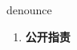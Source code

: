
\begin{frame}
{\huge denounce}
\begin{center}
\begin{enumerate}\Large
  \item \textbf{公开指责}
\end{enumerate}
\end{center}
\end{frame}
